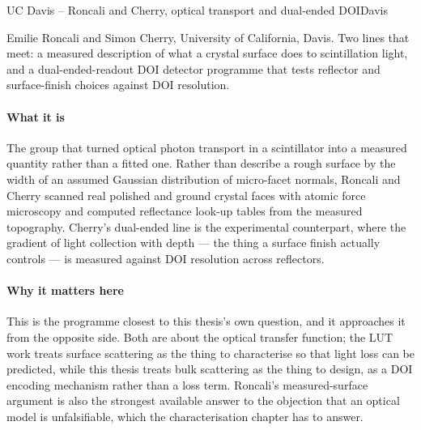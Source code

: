  
\begin{programnote}{UC Davis -- Roncali and Cherry, optical transport and dual-ended DOI}{Davis}

Emilie Roncali and Simon Cherry, University of California, Davis. Two lines
that meet: a measured description of what a crystal surface does to
scintillation light, and a dual-ended-readout DOI detector programme that tests
reflector and surface-finish choices against DOI resolution.

\paragraph{What it is}
The group that turned optical photon transport in a scintillator into a
measured quantity rather than a fitted one. Rather than describe a rough
surface by the width of an assumed Gaussian distribution of micro-facet
normals, Roncali and Cherry scanned real polished and ground crystal faces with
atomic force microscopy and computed reflectance look-up tables from the
measured topography. Cherry's dual-ended line is the experimental counterpart,
where the gradient of light collection with depth --- the thing a surface finish
actually controls --- is measured against DOI resolution across reflectors.

\paragraph{Why it matters here}
This is the programme closest to this thesis's own question, and it approaches
it from the opposite side. Both are about the optical transfer function; the
LUT work treats surface scattering as the thing to characterise so that light
loss can be predicted, while this thesis treats bulk scattering as the thing to
design, as a DOI encoding mechanism rather than a loss term. Roncali's
measured-surface argument is also the strongest available answer to the
objection that an optical model is unfalsifiable, which the characterisation
chapter has to answer.


\end{programnote}
